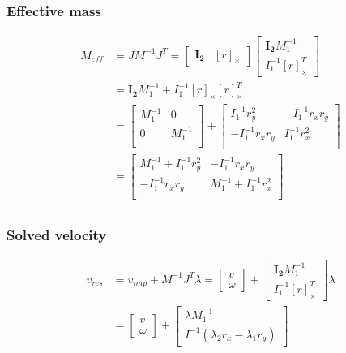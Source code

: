 \documentclass{article}
\begin{document}
	\subsubsection{Effective mass}
	\begin{align*}
		M_{eff}
		&=JM^{-1}J^T=
		\begin{bmatrix}
			\boldsymbol{I_2} & [r]_{\times}
		\end{bmatrix}
		\begin{bmatrix}
			\boldsymbol{I_2} M_1^{-1}\\
			I_1^{-1} [r]_{\times}^T
		\end{bmatrix}\\
		&= \boldsymbol{I_2} M_1^{-1} + I_1^{-1} [r]_{\times} [r]_{\times}^T\\
		&= 
		\begin{bmatrix}
			M_1^{-1} 	& 0\\
			0 			& M_1^{-1}\\
		\end{bmatrix}
		+
		\begin{bmatrix}
			I_1^{-1} r_y^2		& -I_1^{-1} r_x r_y\\
			-I_1^{-1} r_x r_y	& I_1^{-1} r_x^2\\
		\end{bmatrix}\\
		&= 
		\begin{bmatrix}
			M_1^{-1} + I_1^{-1} r_y^2		& -I_1^{-1} r_x r_y\\
			-I_1^{-1} r_x r_y	& M_1^{-1} + I_1^{-1} r_x^2\\
		\end{bmatrix}\\
	\end{align*}
	\subsubsection{Solved velocity}
	\begin{align*}
		v_{res}
		&=v_{imp}+M^{-1}J^T\lambda=
		\begin{bmatrix}
			v\\
			\omega
		\end{bmatrix}
		+
		\begin{bmatrix}
			\boldsymbol{I_2} M_1^{-1}\\
			I_1^{-1} [r]_{\times}^T
		\end{bmatrix} \lambda \\
		&= 
		\begin{bmatrix}
			v\\
			\omega
		\end{bmatrix}
		+
		\begin{bmatrix}
			\lambda M_1^{-1}\\
			I^{-1} (\lambda_2 r_x - \lambda_1 r_y)
		\end{bmatrix}
	\end{align*}
	\newpage
\end{document}
